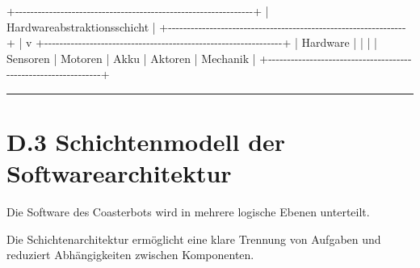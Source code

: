 \documentclass[
]{article}
\newenvironment{Shaded}{}{}
\newcommand{\NormalTok}[1]{#1}
\begin{document}
\begin{Shaded}
\begin{Highlighting}[]
\NormalTok{+{-}{-}{-}{-}{-}{-}{-}{-}{-}{-}{-}{-}{-}{-}{-}{-}{-}{-}{-}{-}{-}{-}{-}{-}{-}{-}{-}{-}{-}{-}{-}{-}{-}{-}{-}{-}{-}{-}{-}{-}{-}{-}{-}{-}{-}{-}{-}{-}{-}{-}{-}{-}{-}{-}{-}{-}{-}{-}{-}{-}{-}{-}{-}+}
\NormalTok{|              Hardwareabstraktionsschicht                     |}
\NormalTok{+{-}{-}{-}{-}{-}{-}{-}{-}{-}{-}{-}{-}{-}{-}{-}{-}{-}{-}{-}{-}{-}{-}{-}{-}{-}{-}{-}{-}{-}{-}{-}{-}{-}{-}{-}{-}{-}{-}{-}{-}{-}{-}{-}{-}{-}{-}{-}{-}{-}{-}{-}{-}{-}{-}{-}{-}{-}{-}{-}{-}{-}{-}{-}+}
\NormalTok{                             |}
\NormalTok{                             v}
\NormalTok{+{-}{-}{-}{-}{-}{-}{-}{-}{-}{-}{-}{-}{-}{-}{-}{-}{-}{-}{-}{-}{-}{-}{-}{-}{-}{-}{-}{-}{-}{-}{-}{-}{-}{-}{-}{-}{-}{-}{-}{-}{-}{-}{-}{-}{-}{-}{-}{-}{-}{-}{-}{-}{-}{-}{-}{-}{-}{-}{-}{-}{-}{-}{-}+}
\NormalTok{|                       Hardware                                |}
\NormalTok{|                                                               |}
\NormalTok{| Sensoren | Motoren | Akku | Aktoren | Mechanik                |}
\NormalTok{+{-}{-}{-}{-}{-}{-}{-}{-}{-}{-}{-}{-}{-}{-}{-}{-}{-}{-}{-}{-}{-}{-}{-}{-}{-}{-}{-}{-}{-}{-}{-}{-}{-}{-}{-}{-}{-}{-}{-}{-}{-}{-}{-}{-}{-}{-}{-}{-}{-}{-}{-}{-}{-}{-}{-}{-}{-}{-}{-}{-}{-}{-}{-}+}
\end{Highlighting}
\end{Shaded}

\begin{center}\rule{0.5\linewidth}{0.5pt}\end{center}

\section{D.3 Schichtenmodell der
Softwarearchitektur}\label{d.3-schichtenmodell-der-softwarearchitektur}

Die Software des Coasterbots wird in mehrere logische Ebenen unterteilt.

Die Schichtenarchitektur ermöglicht eine klare Trennung von Aufgaben und
reduziert Abhängigkeiten zwischen Komponenten.
\end{document}
